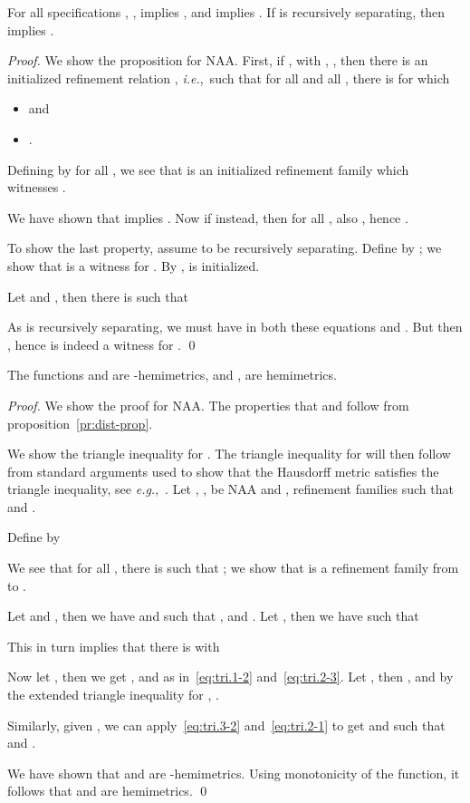 \documentclass[twocolumn]{svjour3-dummy}
\newcommand*\ie{\textit{i.e.},}
\newcommand*\eg{\textit{e.g.},}
\newcommand*\NAA{NAA\xspace}
\begin{document}
\begin{proposition}
  \label{pr:dist-prop}
  For all specifications , ,  implies
  , and  implies .  If  is recursively separating, then
   implies .
\end{proposition}

\begin{proof}We show the proposition for \NAA.  First, if , with
  , , then
  there is an initialized refinement relation , \ie~such that for all  and all , there is  for which
  \begin{itemize}
  \item  and
  \item .
  \end{itemize}
  Defining  by  for
  all , we see that  is an initialized refinement
  family which witnesses .

  We have shown that  implies .  Now if  instead, then for all
  , also , hence .

  To show the last property, assume  to be recursively separating.
  Define  by ; we show that  is a witness for .  By ,  is initialized.

  Let  and , then there is
   such that
  
  As  is recursively separating, we must have  in
  both these equations and .  But then , hence  is indeed a witness for . \qed
\end{proof}

\begin{proposition}
  \label{pr:dist-prop-hemi}
  The functions  and  are -hemi\-metrics, and ,
   are hemimetrics.
\end{proposition}

\begin{proof}
  We show the proof for \NAA.  The properties that  and  follow from
  proposition~\ref{pr:dist-prop}.

  We show the triangle inequality for .  The triangle inequality
  for  will then follow from standard arguments used to show that
  the Hausdorff metric satisfies the triangle inequality, see
  \eg~\cite[Lemma 3.72]{aliprantis2007infinite}.  Let , ,  be \NAA and ,  refinement families such that  and .

  Define  by
  
  We see that for all , there is  such
  that ; we show that  is a refinement family from
   to .

  Let  and , then we have
   and  such that
  ,  and .  Let , then we have  such that
  
  This in turn implies that there is  with
  

  Now let , then we get ,  and  as
  in~\eqref{eq:tri.1-2} and~\eqref{eq:tri.2-3}.  Let , then , and by the
  extended triangle inequality for , .

  Similarly, given , we can apply~\eqref{eq:tri.3-2}
  and~\eqref{eq:tri.2-1} to get  and 
  such that  and .

  We have shown that  and  are -hemimetrics.  Using
  monotonicity of the  function, it follows that  and 
  are hemimetrics.  \qed
\end{proof}
\end{document}

